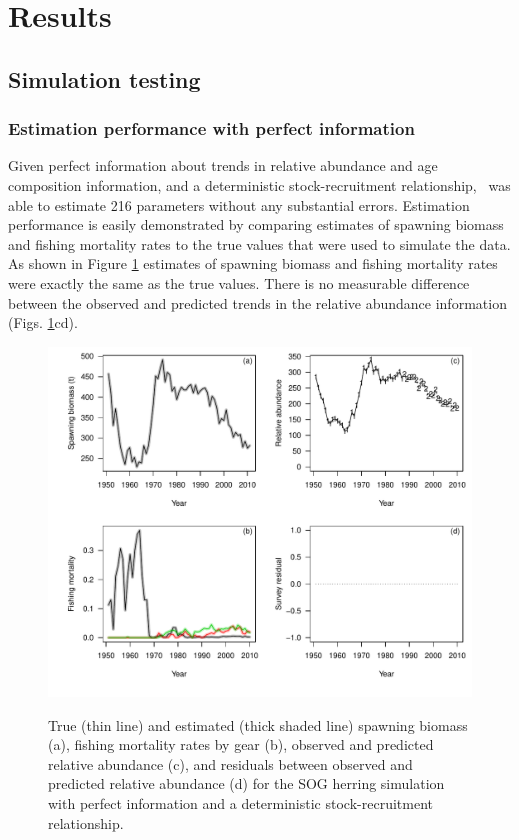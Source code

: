 \section{Results}
	\subsection{Simulation testing}
		\subsubsection{Estimation performance with perfect information}
	
	Given perfect information about trends in relative abundance and age composition information, and a deterministic stock-recruitment relationship, \iscam\ was able to estimate 216 parameters without any substantial errors.	  Estimation performance is easily demonstrated by comparing estimates of spawning biomass and fishing mortality rates to the true values that were used to simulate the data.  As shown in Figure \ref{FigSimPlot} estimates of spawning biomass and fishing mortality rates were exactly the same as the true values. There is no measurable difference between the observed and predicted trends in the relative abundance information (Figs. \ref{FigSimPlot}cd).
	
\begin{figure}[!tbp]
	\includegraphics[width=\textwidth]{../Figs/simPlot.pdf}\\
	\caption{True (thin line) and estimated (thick shaded line) spawning biomass (a), fishing mortality rates by gear (b), observed and predicted relative abundance (c), and residuals between observed and predicted relative abundance (d) for the SOG herring simulation with perfect information and a deterministic stock-recruitment relationship.}\label{FigSimPlot}
\end{figure}
		
